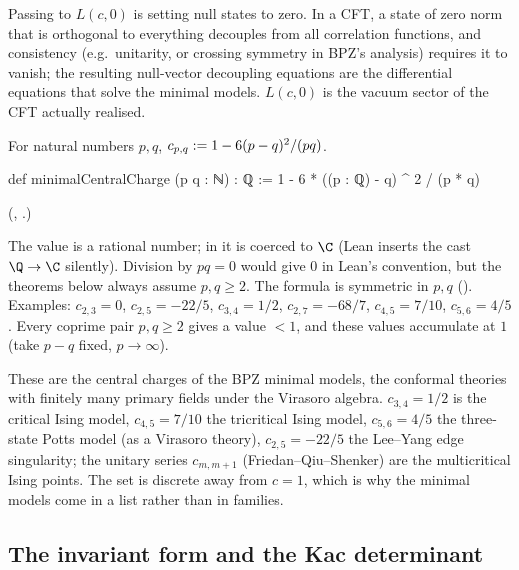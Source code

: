 \begin{physics}
Passing to $L(c,0)$ is setting null states to zero. In a CFT, a state of zero norm that is orthogonal to everything
decouples from all correlation functions, and consistency (e.g.\ unitarity, or crossing symmetry in BPZ's
analysis) requires it to vanish; the resulting null-vector decoupling equations are the differential
equations that solve the minimal models. $L(c,0)$ is the vacuum sector of the CFT actually realised.
\end{physics}

\begin{definition}\label{l07:def:cpq}
For natural numbers $p,q$, $c_{p,q} := 1 - 6(p-q)^2/(pq)$.
\end{definition}
\begin{leancode}
def minimalCentralCharge (p q : ℕ) : ℚ := 1 - 6 * ((p : ℚ) - q) ^ 2 / (p * q)
\end{leancode}
(, .)
\begin{dictionary}
The value is a rational number; in  it is coerced
to $\C$ (Lean inserts the cast $\Q\to\C$ silently). Division by $pq = 0$ would give $0$ in Lean's
convention, but the theorems below always assume $p,q\ge2$. The formula is symmetric in $p,q$
(). Examples: $c_{2,3} = 0$, $c_{2,5} = -22/5$, $c_{3,4} = 1/2$,
$c_{2,7} = -68/7$, $c_{4,5} = 7/10$, $c_{5,6} = 4/5$. Every coprime pair $p,q\ge2$ gives a value
$<1$, and these values accumulate at $1$ (take $p-q$ fixed, $p\to\infty$).
\end{dictionary}

\begin{physics}
These are the central charges of the BPZ minimal models, the conformal theories with finitely many primary
fields under the Virasoro algebra. $c_{3,4}=1/2$ is the critical Ising model, $c_{4,5}=7/10$ the tricritical
Ising model, $c_{5,6}=4/5$ the three-state Potts model (as a Virasoro theory), $c_{2,5}=-22/5$ the Lee--Yang edge
singularity; the unitary series $c_{m,m+1}$ (Friedan--Qiu--Shenker) are the multicritical Ising points. The set is
discrete away from $c=1$, which is why the minimal models come in a list rather than in families.
\end{physics}

\subsection{The invariant form and the Kac determinant}\label{l07:sec:kac}

